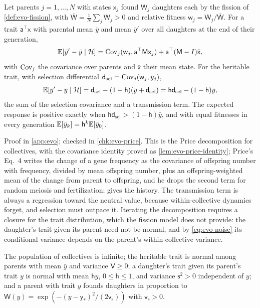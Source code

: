 \begin{proposition}\label{prop:evo-price}
Let parents $j=1,\dots,N$ with states $\mathsf x_j$ found $\mathsf W_j$ daughters each by the fission of \cref{def:evo-fission}, with $\bar{\mathsf W}=\frac1N\sum_j\mathsf W_j>0$ and relative fitness $\mathsf w_j=\mathsf W_j/\bar{\mathsf W}$. For a trait $\mathsf a^\top\mathsf x$ with parental mean $\bar y$ and mean $\bar y'$ over all daughters at the end of their generation,
\begin{equation}\label{eq:evo-price-general}
\mathbb{E}[\bar y'-\bar y\mid\mathcal H]=\operatorname{Cov}_j(\mathsf w_j,\mathsf a^\top\mathsf M\mathsf x_j)+\mathsf a^\top(\mathsf M-I)\bar{\mathsf x},
\end{equation}
with $\operatorname{Cov}_j$ the covariance over parents and $\bar{\mathsf x}$ their mean state. For the heritable trait, with selection differential $\mathsf d_{\mathrm{sel}}=\operatorname{Cov}_j(\mathsf w_j,y_j)$,
\begin{equation}\label{eq:evo-price}
\mathbb{E}[\bar y'-\bar y\mid\mathcal H]=\mathsf d_{\mathrm{sel}}-(1-\mathsf h)(\bar y+\mathsf d_{\mathrm{sel}})=\mathsf h\mathsf d_{\mathrm{sel}}-(1-\mathsf h)\bar y,
\end{equation}
the sum of the selection covariance and a transmission term. The expected response is positive exactly when $\mathsf h\mathsf d_{\mathrm{sel}}>(1-\mathsf h)\bar y$, and with equal fitnesses in every generation $\mathbb{E}[\bar y_k]=\mathsf h^k\mathbb{E}[\bar y_0]$.
\end{proposition}

Proof in \cref{app:evo}; checked in \cref{chk:evo-price}. This is the Price decomposition \citep{price1970selection} for collectives, with the covariance identity proved as \cref{lem:evo-price-identity}; Price's Eq.~4 writes the change of a gene frequency as the covariance of offspring number with frequency, divided by mean offspring number, plus an offspring-weighted mean of the change from parent to offspring, and he drops the second term for random meiosis and fertilization; \citet{harman2020science} gives the history. The transmission term is always a regression toward the neutral value, because within-collective dynamics forget, and selection must outpace it. Iterating the decomposition requires a closure for the trait distribution, which the fission model does not provide: the daughter's trait given its parent need not be normal, and by \eqref{eq:evo-noise} its conditional variance depends on the parent's within-collective variance.

\begin{assumption}\label{ass:evo-gaussian}
The population of collectives is infinite; the heritable trait is normal among parents with mean $\bar y$ and variance $\mathsf V\ge0$; a daughter's trait given its parent's trait $y$ is normal with mean $\mathsf hy$, $0\le\mathsf h\le1$, and variance $\mathsf s^2>0$ independent of $y$; and a parent with trait $y$ founds daughters in proportion to $\mathsf W(y)=\exp(-(y-\mathsf y_\ast)^2/(2\mathsf v_{\mathrm s}))$ with $\mathsf v_{\mathrm s}>0$.
\end{assumption}

